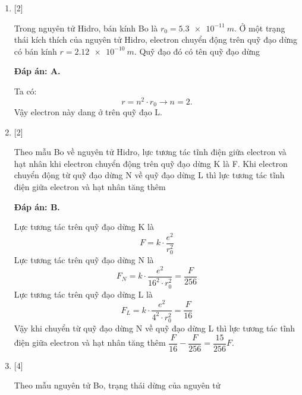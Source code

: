 \begin{enumerate}[label=\bfseries Câu \arabic*:]
		\item {} [2]
	
		\cauhoi
		{Trong nguyên tử Hidro, bán kính Bo là $ r_{0} = \SI{5,3e-11}{m} $. Ở một trạng thái kích thích của nguyên tử Hidro, electron chuyển động trên quỹ đạo dừng có bán kính $ r = \SI{2,12e-10}{m} $. Quỹ đạo đó có tên quỹ đạo dừng
		}
		
		
		\loigiai
		{		\textbf{Đáp án: A.}

Ta có:
$$
	r = n^{2} \cdot r_{0} \rightarrow n = \num{2}.
$$
Vậy electron này dang ở trên quỹ đạo L.		
		}
		
		\item {} [2]
	
		\cauhoi
		{Theo mẫu Bo về nguyên tử Hidro, lực tương tác tĩnh điện giữa electron và hạt nhân khi electron chuyển động trên quỹ đạo dừng K là F. Khi electron chuyển động từ quỹ đạo dừng N về quỹ đạo dừng L thì lực tương tác tĩnh điện giữa electron và hạt nhân tăng thêm
		}
	
		\loigiai
		{		\textbf{Đáp án: B.}

Lực tương tác trên quỹ đạo dừng K là
$$
	F = k \cdot \dfrac{e^{2}}{r_{0}^2}
$$ 
Lực tương tác trên quỹ đạo dừng N là
$$
	F_{N} = k \cdot \dfrac{e^{2}}{16^{2} \cdot r_{0}^2} = \dfrac{F}{256}
$$   
Lực tương tác trên quỹ đạo dừng L là
$$
	F_{L} = k \cdot \dfrac{e^{2}}{4^{2} \cdot r_{0}^2} = \dfrac{F}{16}
$$           		
Vậy khi chuyển từ quỹ đạo dừng N về quỹ đạo dừng L thì lực tương tác tĩnh điện giữa electron và hạt nhân tăng thêm $ \dfrac{F}{16} - \dfrac{F}{256} = \dfrac{15}{256} F$.
		}
		
		\item {} [4]
	
		\cauhoi
		{Theo mẫu nguyên tử Bo, trạng thái dừng của nguyên tử
		}
	

\end{enumerate}
